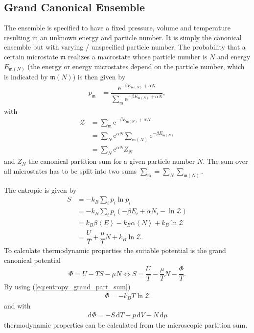 \documentclass[a4paper,10pt]{article}
\newcommand{\td}{\,\text{d}}
\numberwithin{equation}{section}
\begin{document}
\begin{multicols}{2}
\subsection{Grand Canonical Ensemble}
The ensemble is specified to have a fixed pressure, volume and temperature resulting in an unknown energy and particle number.
It is simply the canonical ensemble but with varying / unspecified particle number.
The probability that a certain microstate $\mathfrak{m}$ realizes a macrostate whose particle number is $N$ and energy $E_{\mathfrak{m}(N)}$ (the energy or energy microstates depend on the particle number, which is indicated by $\mathfrak{m}(N)$) is then given by
\begin{align} 
  p_\mathfrak{m} &= \dfrac{\text{e}^{-\beta E_{\mathfrak{m}(N)}+\alpha N}}{\sum_{\mathfrak{m}}^{}\text{e}^{-\beta E_{\mathfrak{m}(N)}+\alpha N}}
,\end{align} 
with
\begin{align} 
  \mathcal{Z} &= \sum_{\mathfrak{m}}^{}\text{e}^{-\beta E_{\mathfrak{m}(N)}+\alpha N}\\
              &= \sum_{N}^{}\text{e}^{\alpha N}\sum_{\mathfrak{m}(N)}^{}\text{e}^{-\beta E_{\mathfrak{m}(N)}}\\
              &= \sum_{N}^{}\text{e}^{\alpha N}Z_N
\end{align} 
and $Z_N$ the canonical partition sum for a given particle number $N$.
The sum over all microstates has to be split into two sums $\sum_{\mathfrak{m}}^{}=\sum_{N}^{}\sum_{\mathfrak{m}(N)}^{}$.

The entropie is given by
\begin{align} 
  S &= -k_B\sum_{i}^{}p_i\ln p_i\\
    &= -k_B\sum_{i}^{}p_i\left(-\beta E_i+\alpha N_i-\ln \mathcal{Z}\right)\\
    &= k_B\beta \left\langle E\right\rangle -k_B\alpha \left\langle N\right\rangle +k_B\ln\mathcal{Z}\\
    &= \dfrac{U}{T}+\dfrac{\mu }{T}N+k_B\ln\mathcal{Z} \label{eq:entropy_grand_part_sum}
.\end{align} 
To calculate thermodynamic properties the suitable potential is the grand canonical potential
\begin{align} 
  \Phi = U-TS-\mu N\Leftrightarrow S=\dfrac{U}{T}-\dfrac{\mu }{T}N-\dfrac{\Phi }{T}
.\end{align} 
By using (\ref{eq:entropy_grand_part_sum})
\begin{align} 
  \boxed{\Phi =-k_BT\ln\mathcal{Z}}
\end{align} 
and with
\begin{align} 
  \td \Phi =-S\td T-p\td V-N\td \mu 
\end{align} 
thermodynamic properties can be calculated from the microscopic partition sum.


\end{multicols}
\end{document}
